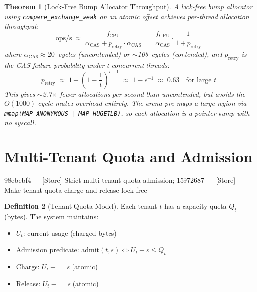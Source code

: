\documentclass[11pt,a4paper,twoside]{article}
\theoremstyle{plain}
\newtheorem{theorem}{Theorem}[section]
\theoremstyle{definition}
\newtheorem{definition}[theorem]{Definition}
\theoremstyle{remark}
\begin{document}
\begin{theorem}[Lock-Free Bump Allocator Throughput]
\label{thm:lock-free-arena}
A lock-free bump allocator using \texttt{compare\_exchange\_weak} on an atomic offset
achieves per-thread allocation throughput:
\begin{equation}
  \text{ops/s} \;\approx\; \frac{f_{\text{CPU}}}{\alpha_{\text{CAS}} + p_{\text{retry}} \cdot \alpha_{\text{CAS}}}
  \;=\; \frac{f_{\text{CPU}}}{\alpha_{\text{CAS}}} \cdot \frac{1}{1 + p_{\text{retry}}}
\end{equation}
where $\alpha_{\text{CAS}} \approx 20$~cycles (uncontended) or $\sim$100~cycles (contended),
and $p_{\text{retry}}$ is the CAS failure probability under $t$ concurrent threads:
\begin{equation}
  p_{\text{retry}} \;\approx\; 1 - \left(1 - \frac{1}{t}\right)^{t-1}
  \;\approx\; 1 - e^{-1} \;\approx\; 0.63 \quad\text{for large } t
\end{equation}
This gives $\sim$2.7$\times$ fewer allocations per second than uncontended, but avoids
the $O(1000)$-cycle mutex overhead entirely. The arena pre-maps a large region via
\texttt{mmap(MAP\_ANONYMOUS | MAP\_HUGETLB)}, so each allocation is a pointer bump
with no syscall.
\end{theorem}


\section{Multi-Tenant Quota and Admission}
\label{sec:tenant-quota}

\begin{commitbox}{98ebebf4 --- [Store] Strict multi-tenant quota admission;
15972687 --- [Store] Make tenant quota charge and release lock-free}
\end{commitbox}

\begin{definition}[Tenant Quota Model]
\label{def:tenant-quota}
Each tenant $t$ has a capacity quota $Q_t$ (bytes). The system maintains:
\begin{itemize}[nosep]
  \item $U_t$: current usage (charged bytes)
  \item Admission predicate: $\text{admit}(t, s) \iff U_t + s \leq Q_t$
  \item Charge: $U_t \mathrel{+}= s$ (atomic)
  \item Release: $U_t \mathrel{-}= s$ (atomic)
\end{itemize}
\end{definition}
\end{document}
